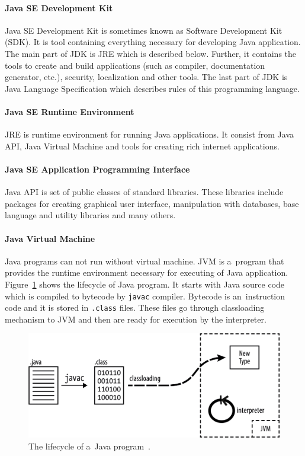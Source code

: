 \paragraph{Java SE Development Kit}
Java SE Development Kit is sometimes known as Software Development Kit (SDK). It is tool containing everything necessary
for developing Java application. The main part of JDK is JRE which is described below. Further, it contains the tools
to create and build applications (such as compiler, documentation generator, etc.), security, localization and other
tools. The last part of JDK is Java Language Specification which describes rules of this programming language.

\paragraph{Java SE Runtime Environment}
JRE is runtime environment for running Java applications. It consist from Java API, Java Virtual Machine and tools for
creating rich internet applications.

\paragraph{Java SE Application Programming Interface}
Java API is set of public classes of standard libraries. These libraries include packages for creating graphical user
interface, manipulation with databases, base language and utility libraries and many others.

\paragraph{Java Virtual Machine}
Java programs can not run without virtual machine. JVM is a~program that provides the runtime environment necessary for
executing of Java application. Figure~\ref{JavaLifecycleFigure} shows the lifecycle of Java program. It starts with
Java source code which is compiled to bytecode by \texttt{javac} compiler. Bytecode is an~instruction code and it is
stored in \texttt{.class} files. These files go through classloading mechanism to JVM and then are ready for execution
by the interpreter.
\\
\begin{figure}[h!]
    \centering
    \includegraphics[scale=0.3]{fig/java_program_lifecycle.png}
    \caption{The lifecycle of a~Java program~\cite{JavaBook}.}
    \label{JavaLifecycleFigure}
\end{figure}
